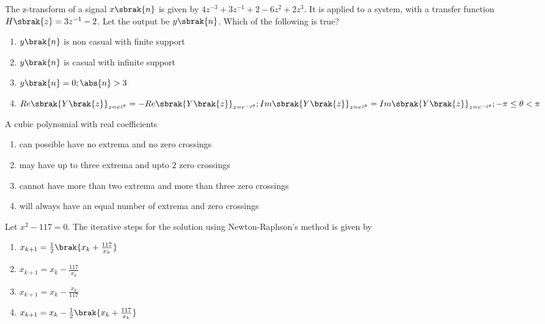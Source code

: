 \iffalse
	\chapter{2009}
	\author{AI24BTECH11001}
	\section{ee}
\fi	
    \item The z-transform of a signal $x\sbrak{n}$ is given by $4z^{-3} + 3z^{-1} + 2 - 6z^{2} + 2z^{3}$. It is applied to a system, with a transfer function $H\sbrak{z} = 3z^{-1} -2$. Let the output be $y\sbrak{n}$. Which of the following is true?
    \begin{enumerate}
        \item $y\brak{n}$ is non casual with finite support
        \item $y\brak{n}$ is casual with infinite support
        \item $y\brak{n}=0 ; \abs{n}>3$
        \item $Re\sbrak{Y\brak{z}}_{z=e^{j\theta}}=-Re\sbrak{Y\brak{z}}_{z=e^{-j\theta}};Im\sbrak{Y\brak{z}}_{z=e^{j\theta}}=Im\sbrak{Y\brak{z}}_{z=e^{-j\theta}};-\pi\leq \theta < \pi$
    \end{enumerate}


    \item A cubic polynomial with real coefficients
    \begin{enumerate}
        \item can possible have no extrema and no zero crossings
        \item may have up to three extrema and upto $2$ zero crossings
        \item cannot have more than two extrema and more than three zero crossings
        \item will always have an equal number of extrema and zero crossings
    \end{enumerate}

    \item Let $x^2 - 117 =0$. The iterative steps for the solution using Newton-Raphson's method is given by
    \begin{enumerate}
        \item $x_{k+1} = \frac{1}{2}\brak{x_k + \frac{117}{x_k}}$
        \item $x_{k+1} = x_k - \frac{117}{x_k}$
        \item $x_{k+1} = x_k - \frac{x_k}{117}$
        \item $x_{k+1} = x_k - \frac{1}{2}\brak{x_k + \frac{117}{x_k}}$
    \end{enumerate}

